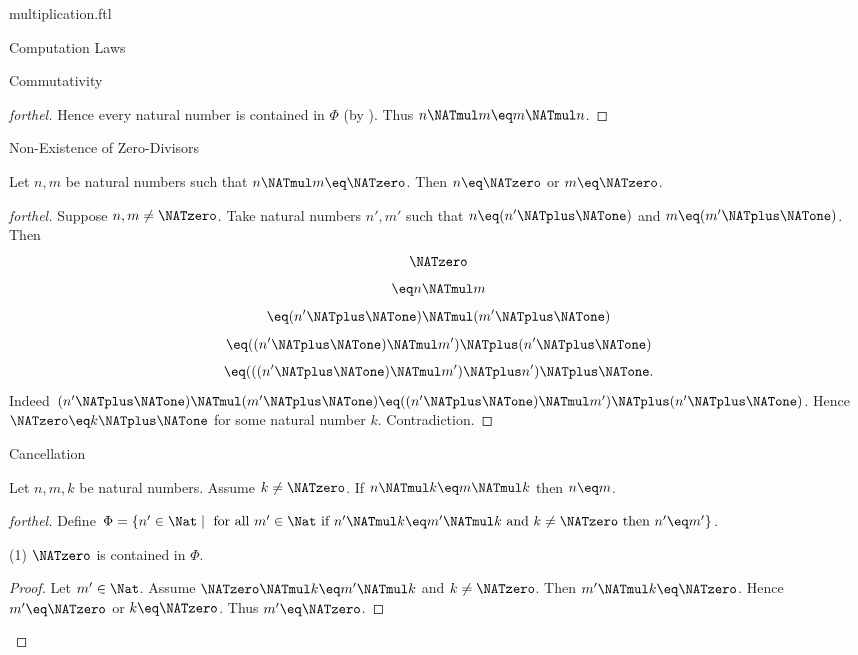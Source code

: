 \documentclass{naproche-library}
\begin{document}
\begin{smodule}[title=Multiplication]{multiplication.ftl}
\begin{sfragment}{Computation Laws}
\begin{sfragment}{Commutativity}
\begin{proof}[forthel]
      Hence every natural number is contained in $\Phi$ (by ).
      Thus $n \NATmul m \eq m \NATmul n$.
    \end{proof}
  \end{sfragment}

  \begin{sfragment}{Non-Existence of Zero-Divisors}
    \begin{proposition}[forthel,id=ARITHMETIC_06_3843962875936768]
      Let $n, m$ be natural numbers such that $n \NATmul m \eq \NATzero$.
      Then $n \eq \NATzero$ or $m \eq \NATzero$.
    \end{proposition}
    \begin{proof}[forthel]
      Suppose $n, m \neq \NATzero$.
      Take natural numbers $n', m'$ such that $n \eq (n' \NATplus \NATone)$ and $m \eq (m' \NATplus \NATone)$.
      Then
      \[  \NATzero                                     \]
      \[    \eq n \NATmul m                         \]
      \[    \eq (n' \NATplus \NATone) \NATmul (m' \NATplus \NATone)           \]
      \[    \eq ((n' \NATplus \NATone) \NATmul m') \NATplus (n' \NATplus \NATone)    \]
      \[    \eq (((n' \NATplus \NATone) \NATmul m') \NATplus n') \NATplus \NATone.   \]
      Indeed $(n' \NATplus \NATone) \NATmul (m' \NATplus \NATone) \eq ((n' \NATplus \NATone) \NATmul m') \NATplus (n' \NATplus \NATone)$.
      Hence $\NATzero \eq k \NATplus \NATone$ for some natural number $k$.
      Contradiction.
    \end{proof}
  \end{sfragment}

  \begin{sfragment}{Cancellation}
    \begin{proposition}[forthel,id=ARITHMETIC_06_31055184658432]
      Let $n, m, k$ be natural numbers.
      Assume $k \neq \NATzero$.
      If $n \NATmul k \eq m \NATmul k$ then $n \eq m$.
    \end{proposition}
    \begin{proof}[forthel]
      Define $\Phi = \{ n' \in \Nat \mid\text{ for all }m' \in \Nat\text{ if }n' \NATmul k \eq m' \NATmul k\text{ and }k \neq \NATzero\text{ then }n' \eq m' \}$.

      (1) $\NATzero$ is contained in $\Phi$.
      \begin{proof}
        Let $m' \in \Nat$.
        Assume $\NATzero \NATmul k \eq m' \NATmul k$ and $k \neq \NATzero$.
        Then $m' \NATmul k \eq \NATzero$.
        Hence $m' \eq \NATzero$ or $k \eq \NATzero$.
        Thus $m' \eq \NATzero$.
      \end{proof}


\end{proof}
\end{sfragment}
\end{sfragment}
\end{smodule}
\end{document}
